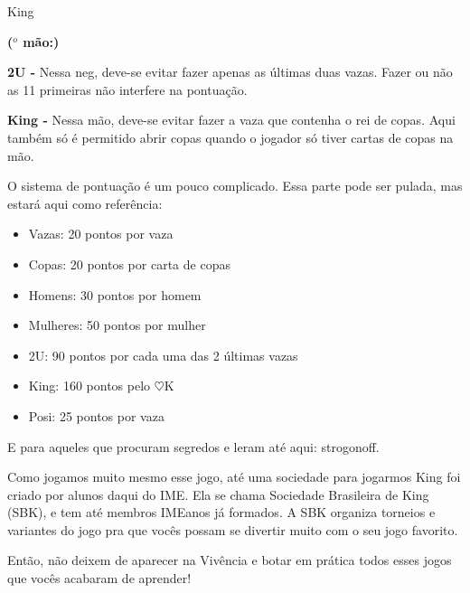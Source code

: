 \begin{subsecao}{King}
\begin{list}{\textbf{ ($^{o}$ mão:)}}{}
\item \textbf{2U -} Nessa neg, deve-se evitar fazer apenas as últimas
duas vazas. Fazer ou não as 11 primeiras não interfere na pontuação.

\item \textbf{King -} Nessa mão, deve-se evitar fazer a vaza que contenha o
rei de copas. Aqui também só é permitido abrir copas quando o jogador só
tiver cartas de copas na mão.

\end{list}

O sistema de pontuação é um pouco complicado. Essa parte pode ser pulada,
mas estará aqui como referência:
\begin{itemize}

\item Vazas:	  20 pontos por vaza
\item Copas:	  20 pontos por carta de copas
\item Homens:	  30 pontos por homem
\item Mulheres: 50 pontos por mulher
\item 2U:	  90 pontos por cada uma das 2 últimas vazas
\item King:    160 pontos pelo $\heartsuit$K
\item Posi:	  25 pontos por vaza

\end{itemize}

E para aqueles que procuram segredos e leram até aqui: strogonoff.

Como jogamos muito mesmo esse jogo, até uma sociedade para jogarmos King
foi criado por alunos daqui do IME. Ela se chama Sociedade Brasileira de
King (SBK), e tem até membros IMEanos já formados. A SBK organiza torneios
e variantes do jogo pra que vocês possam se divertir muito com o seu jogo
favorito.

Então, não deixem de aparecer na Vivência e botar em prática todos esses
jogos que vocês acabaram de aprender!

\end{subsecao}
